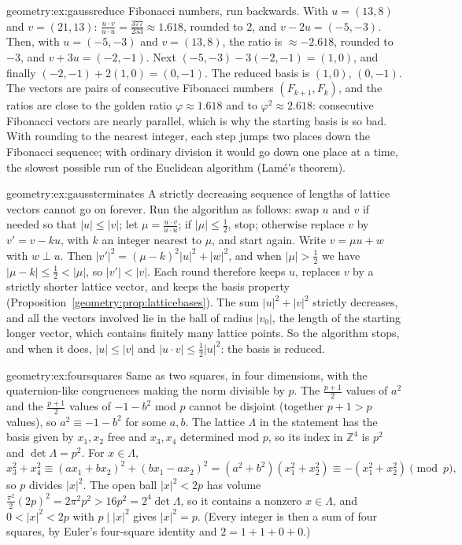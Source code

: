 \begin{solution}{geometry:ex:gaussreduce}
\idea Fibonacci numbers, run backwards.
\writeup With $u=(13,8)$ and $v=(21,13)$: $\frac{u\cdot v}{u\cdot u}=\frac{377}{233}\approx1.618$, rounded to $2$, and $v-2u=(-5,-3)$. Then, with
$u=(-5,-3)$ and $v=(13,8)$, the ratio is $\approx-2.618$, rounded to $-3$, and $v+3u=(-2,-1)$. Next $(-5,-3)-3(-2,-1)=(1,0)$, and finally
$(-2,-1)+2(1,0)=(0,-1)$. The reduced basis is $(1,0)$, $(0,-1)$. The vectors are pairs of consecutive Fibonacci numbers $(F_{k+1},F_k)$, and the ratios are close
to the golden ratio $\varphi\approx1.618$ and to $\varphi^2\approx2.618$: consecutive Fibonacci vectors are nearly parallel, which is why the starting basis is
so bad. With rounding to the nearest integer, each step jumps two places down the Fibonacci sequence; with ordinary division it would go down one place
at a time, the slowest possible run of the Euclidean algorithm (Lam\'e's theorem).
\end{solution}

\begin{solution}{geometry:ex:gaussterminates}
\idea A strictly decreasing sequence of lengths of lattice vectors cannot go on forever.
\writeup Run the algorithm as follows: swap $u$ and $v$ if needed so that $|u|\le|v|$; let $\mu=\frac{u\cdot v}{u\cdot u}$; if $|\mu|\le\frac12$, stop;
otherwise replace $v$ by $v'=v-ku$, with $k$ an integer nearest to $\mu$, and start again. Write $v=\mu u+w$ with $w\perp u$. Then
$|v'|^2=(\mu-k)^2|u|^2+|w|^2$, and when $|\mu|>\frac12$ we have $|\mu-k|\le\frac12<|\mu|$, so $|v'|<|v|$. Each round therefore keeps $u$, replaces $v$ by a
strictly shorter lattice vector, and keeps the basis property (Proposition~\ref{geometry:prop:latticebases}). The sum $|u|^2+|v|^2$ strictly decreases, and all the vectors
involved lie in the ball of radius $|v_0|$, the length of the starting longer vector, which contains finitely many lattice points. So the algorithm stops, and
when it does, $|u|\le|v|$ and $|u\cdot v|\le\frac12|u|^2$: the basis is reduced.
\end{solution}

\begin{solution}{geometry:ex:foursquares}
\idea Same as two squares, in four dimensions, with the quaternion-like congruences making the norm divisible by $p$.
\writeup The $\frac{p+1}2$ values of $a^2$ and the $\frac{p+1}2$ values of $-1-b^2$ mod $p$ cannot be disjoint (together $p+1>p$ values), so $a^2\equiv-1-b^2$ for some
$a,b$. The lattice $\Lambda$ in the statement has the basis given by $x_1,x_2$ free and $x_3,x_4$ determined mod $p$, so its index in $\mathbb Z^4$ is $p^2$ and
$\det\Lambda=p^2$. For $x\in\Lambda$,
\[
x_3^2+x_4^2\equiv(ax_1+bx_2)^2+(bx_1-ax_2)^2=(a^2+b^2)(x_1^2+x_2^2)\equiv-(x_1^2+x_2^2)\pmod p,
\]
so $p$ divides $|x|^2$. The open ball $|x|^2<2p$ has volume $\frac{\pi^2}2(2p)^2=2\pi^2p^2>16p^2=2^4\det\Lambda$, so it contains a nonzero $x\in\Lambda$, and
$0<|x|^2<2p$ with $p\mid|x|^2$ gives $|x|^2=p$. (Every integer is then a sum of four squares, by Euler's four-square identity and $2=1+1+0+0$.)
\end{solution}

